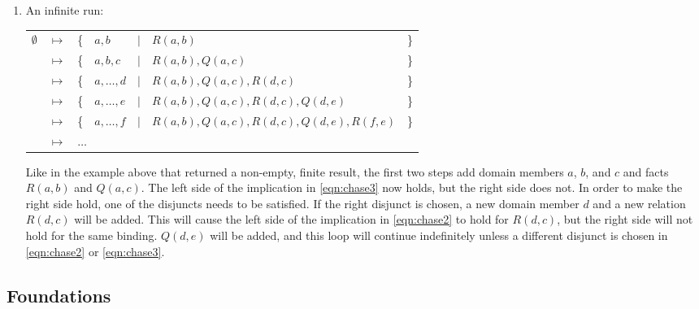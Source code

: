 \begin{enumerate}
		\item An infinite run:

			\begin{tabular}{lllllll}
				$\emptyset$ & $\mapsto$ & \{ & $a,b$        & $\mid$ & $R(a,b)$                                 & \} \\
				{}          & $\mapsto$ & \{ & $a,b,c$      & $\mid$ & $R(a,b), Q(a,c)$                         & \} \\
				{}          & $\mapsto$ & \{ & $a,\ldots,d$ & $\mid$ & $R(a,b), Q(a,c), R(d,c)$                 & \} \\
				{}          & $\mapsto$ & \{ & $a,\ldots,e$ & $\mid$ & $R(a,b), Q(a,c), R(d,c), Q(d,e)$         & \} \\
				{}          & $\mapsto$ & \{ & $a,\ldots,f$ & $\mid$ & $R(a,b), Q(a,c), R(d,c), Q(d,e), R(f,e)$ & \} \\
				{}          & $\mapsto$ & \multicolumn{5}{l}{ $\ldots$ }
			\end{tabular}

			Like in the example above that returned a non-empty, finite result,
			the first two steps add domain members $a$, $b$, and $c$ and facts
			$R(a,b)$ and $Q(a,c)$. The left side of the implication in
			\eqref{eqn:chase3} now holds, but the right side does not. In order
			to make the right side hold, one of the disjuncts needs to be
			satisfied. If the right disjunct is chosen, a new domain member $d$
			and a new relation $R(d,c)$ will be added. This will cause the left
			side of the implication in \eqref{eqn:chase2} to hold for $R(d,c)$,
			but the right side will not hold for the same binding. $Q(d,e)$
			will be added, and this loop will continue indefinitely unless a
			different disjunct is chosen in \eqref{eqn:chase2} or
			\eqref{eqn:chase3}.

		\end{enumerate}

	\subsection{Foundations}



